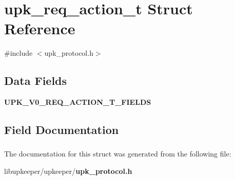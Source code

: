 \section{upk\_\-req\_\-action\_\-t Struct Reference}
\label{structupk__req__action__t}


{\ttfamily \#include $<$upk\_\-protocol.h$>$}

\subsection*{Data Fields}
\begin{DoxyCompactItemize}
\item 
{\bf UPK\_\-V0\_\-REQ\_\-ACTION\_\-T\_\-FIELDS}
\end{DoxyCompactItemize}


\subsection{Field Documentation}
\subsubsection[{UPK\_\-V0\_\-REQ\_\-ACTION\_\-T\_\-FIELDS}]{}\label{structupk__req__action__t_ade60e37e9de796558057acc11c27f5fa}


The documentation for this struct was generated from the following file:\begin{DoxyCompactItemize}
\item 
libupkeeper/upkeeper/{\bf upk\_\-protocol.h}\end{DoxyCompactItemize}
